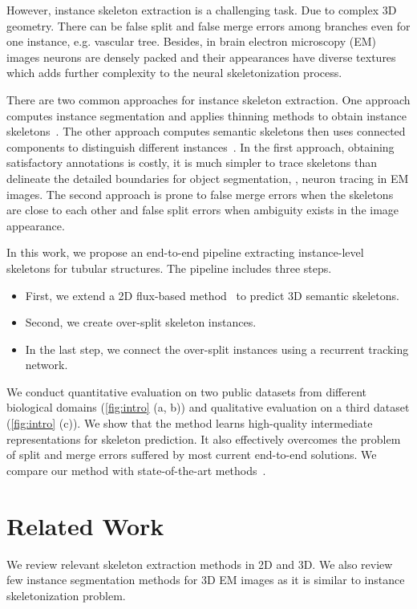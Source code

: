However, instance skeleton extraction is a challenging task. Due to complex 3D geometry. There can be false split and false merge errors among branches even for one instance, e.g. vascular tree. Besides, in brain electron microscopy (EM) images neurons are densely packed and their appearances have diverse textures which adds further complexity to the neural skeletonization process. 

There are two common approaches for instance skeleton extraction. One approach computes instance segmentation and applies thinning methods to obtain instance skeletons~\cite{Januszewski2018FFN}. The other approach computes semantic skeletons then uses connected components to distinguish different instances~\cite{Xu2019}.
In the first approach, obtaining satisfactory annotations is costly, it is much simpler to trace skeletons than delineate the detailed boundaries for object segmentation, \eg, neuron tracing in EM images. The second approach is prone to false merge errors when the skeletons are close to each other and false split errors when ambiguity exists in the image appearance.

In this work, we propose an end-to-end pipeline extracting instance-level skeletons for tubular structures. The pipeline includes three steps. 
\begin{itemize}
	\item First, we extend a 2D flux-based method~\cite{Wang2019} to predict 3D semantic skeletons. 
	\item Second, we create over-split skeleton instances. 
	\item In the last step, we connect the over-split instances using a recurrent tracking network.
\end{itemize}
We conduct quantitative evaluation on two public datasets from different biological domains (\autoref{fig:intro} (a, b)) and qualitative evaluation on a third dataset (\autoref{fig:intro} (c)). We show that the method learns high-quality intermediate representations for skeleton prediction. It also effectively overcomes the problem of split and merge errors suffered by most current end-to-end solutions. We compare our method with state-of-the-art methods~\cite{cciccek20163d,wang2019deep,Wang2019}.

\section{Related Work}
We review relevant skeleton extraction methods in 2D and 3D. We also review few instance segmentation methods for 3D EM images as it is similar to instance skeletonization problem.

